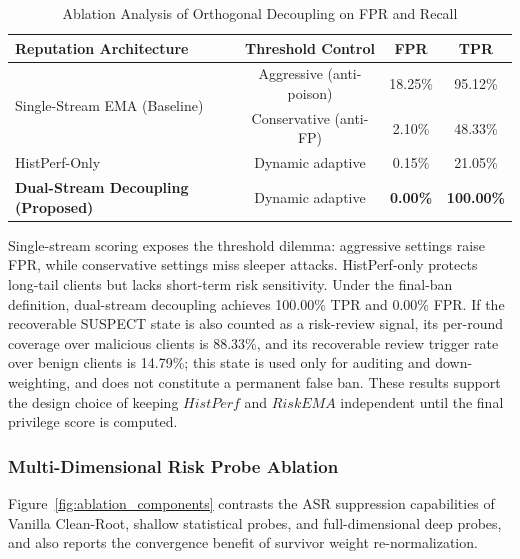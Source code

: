 \documentclass[final,5p,times,twocolumn]{elsarticle/elsarticle}
\begin{document}
\begin{table}[t]
    \centering
    \caption{Ablation Analysis of Orthogonal Decoupling on FPR and Recall}
    \label{tab:ablation_stream}
    \begin{tabular}{l c c c}
        \toprule
        \textbf{Reputation Architecture}              & \textbf{Threshold Control} & \textbf{FPR}    & \textbf{TPR}      \\
        \midrule
        \multirow{2}{*}{Single-Stream EMA (Baseline)} & Aggressive (anti-poison)   & 18.25\%         & 95.12\%           \\
                                                      & Conservative (anti-FP)     & 2.10\%          & 48.33\%           \\
        \midrule
        HistPerf-Only                                 & Dynamic adaptive           & 0.15\%          & 21.05\%           \\
        \textbf{Dual-Stream Decoupling (Proposed)}    & Dynamic adaptive           & \textbf{0.00\%} & \textbf{100.00\%} \\
        \bottomrule
    \end{tabular}
\end{table}

Single-stream scoring exposes the threshold dilemma: aggressive settings raise FPR, while conservative settings miss sleeper attacks. HistPerf-only protects long-tail clients but lacks short-term risk sensitivity. Under the final-ban definition, dual-stream decoupling achieves 100.00\% TPR and 0.00\% FPR. If the recoverable SUSPECT state is also counted as a risk-review signal, its per-round coverage over malicious clients is 88.33\%, and its recoverable review trigger rate over benign clients is 14.79\%; this state is used only for auditing and down-weighting, and does not constitute a permanent false ban. These results support the design choice of keeping $HistPerf$ and $RiskEMA$ independent until the final privilege score is computed.

\subsubsection{Multi-Dimensional Risk Probe Ablation}
Figure~\ref{fig:ablation_components} contrasts the ASR suppression capabilities of Vanilla Clean-Root, shallow statistical probes, and full-dimensional deep probes, and also reports the convergence benefit of survivor weight re-normalization.
\end{document}
